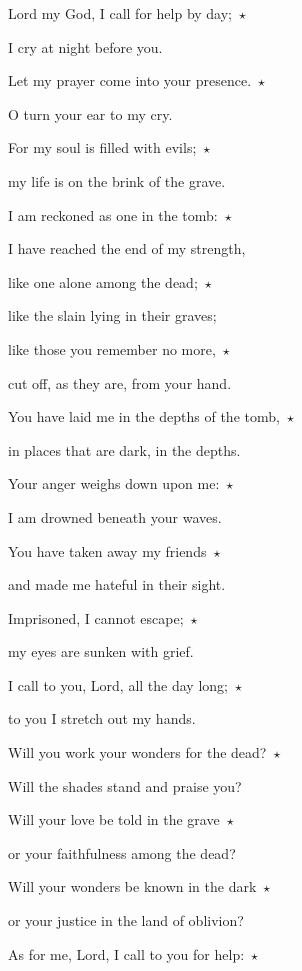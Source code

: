\noindent Lord my God, I call for help by day;~$\star$~\nopagebreak

I cry at night before you.

\noindent Let my prayer come into your presence.~$\star$~\nopagebreak

O turn your ear to my cry.

\noindent For my soul is filled with evils;~$\star$~\nopagebreak

my life is on the brink of the grave.

\noindent I am reckoned as one in the tomb:~$\star$~\nopagebreak

I have reached the end of my strength,

\noindent like one alone among the dead;~$\star$~\nopagebreak

like the slain lying in their graves;

\noindent like those you remember no more,~$\star$~\nopagebreak

cut off, as they are, from your hand.

\noindent You have laid me in the depths of the tomb,~$\star$~\nopagebreak

in places that are dark, in the depths.

\noindent Your anger weighs down upon me:~$\star$~\nopagebreak

I am drowned beneath your waves.

\noindent You have taken away my friends~$\star$~\nopagebreak

and made me hateful in their sight.

\noindent Imprisoned, I cannot escape;~$\star$~\nopagebreak

my eyes are sunken with grief.

\noindent I call to you, Lord, all the day long;~$\star$~\nopagebreak

to you I stretch out my hands.

\noindent Will you work your wonders for the dead?~$\star$~\nopagebreak

Will the shades stand and praise you?

\noindent Will your love be told in the grave~$\star$~\nopagebreak

or your faithfulness among the dead?

\noindent Will your wonders be known in the dark~$\star$~\nopagebreak

or your justice in the land of oblivion?

\noindent As for me, Lord, I call to you for help:~$\star$~\nopagebreak

